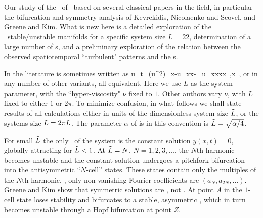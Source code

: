 Our study of the \eqva\ of
\KSe\ based on several classical papers in the field,
in particular the bifurcation and symmetry analysis of
Kevrekidis, Nicolaenko and Scovel,
and
Greene and Kim. What is new here is
a detailed exploration of the \eqva\ stable/unstable manifolds
for a specific system size $L = 22$, determination
of a large number of \rpo s, and a preliminary
exploration of the relation between the
observed spatiotemporal ``turbulent" patterns and
the \rpo s.



In the literature  is sometimes written as
\beq
    u_t=(u^2)_x-u_{xx}- \nu \, u_{xxxx}
    \,,\qquad   x \in [0,L]
    \,,
or in any number of other variants, all equivalent.
Here we use
$L$ as the system parameter, with the ``hyper-viscosity" $\nu$ fixed to $1$.
Other authors vary  $\nu$, with $L$ fixed to either $1$ or $2\pi$.
To minimize confusion,
in what follows we shall state results of all 
calculations either in units of the dimensionless system size $\tilde{L}$,
or the systems size $L = 2 \pi \tilde{L}$. The parameter $\alpha$
of  is in this convention is
$\tilde{L}=\sqrt{\alpha/4}$.


For small $\tilde{L}$ the only \eqv\ of the system is the 
constant solution $y(x,t)=0$,
globally attracting 
for $\tilde{L}<1$. At $\tilde{L}=N$, $N=1,2,3, \dots$, 
the $N$th harmonic becomes unstable and the constant solution
undergoes a pitchfork bifurcation into
the antisymmetric ``$N$-cell'' states. 
These states contain only the multiples of the $N$th
harmonic, {\ie}, only non-vanishing Fourier coefficients
are $(a_N,a_{2N},\dots)$.
Greene and Kim show that symmetric solutions are \eqva, not \reqva. 
At point $A$ in 
the $1$-cell state loses stability
and bifurcates to a stable, 
asymmetric \reqv, which in turn becomes unstable
through a Hopf bifurcation at point $Z$. 


